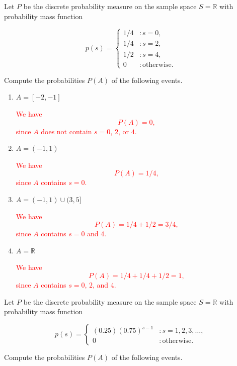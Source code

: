 \documentclass[12pt,reqno]{amsart}
\begin{document}
\bigskip
\prob Let $P$ be the discrete probability measure on the sample space $S=\mathbb{R}$ with probability mass function

	\[
	p(s) = \begin{cases}
	1/4 & : s=0, \\
	1/4 & : s=2, \\
	1/2 & : s=4, \\
	0 & : \text{otherwise}.
	\end{cases}
	\]

Compute the probabilities $P(A)$ of the following events.

\medskip
\begin{enumerate}
\item $A = [-2, -1]$
    
\bigskip
\textcolor{red}{We have
	\[
	P(A) = 0,
	\]
since $A$ does not contain $s=0$, $2$, or $4$.}
\bigskip

\item $A = (-1, 1)$
    
\bigskip
\textcolor{red}{We have
	\[
	P(A) = 1/4,
	\]
	since $A$ contains $s=0$.}
\bigskip

\item $A = (-1, 1) \cup (3,5]$
    
\bigskip
\textcolor{red}{We have
	\[
	P(A) = 1/4 + 1/2 = 3/4,
	\]
since $A$ contains $s=0$ and $4$.}
\bigskip
    
\item $A = \mathbb{R}$
    
\bigskip
\textcolor{red}{We have
	\[
	P(A) = 1/4 +1/4+ 1/2 = 1,
	\]
since $A$ contains $s=0$, $2$, and $4$.}
\end{enumerate}









\bigskip
\prob Let $P$ be the discrete probability measure on the sample space $S=\mathbb{R}$ with probability mass function

	\[
	p(s) = \begin{cases}
	(0.25) (0.75)^{s-1} & : s=1, 2, 3, \ldots, \\
	0 & : \text{otherwise}.
	\end{cases}
	\]

Compute the probabilities $P(A)$ of the following events.
\end{document}
